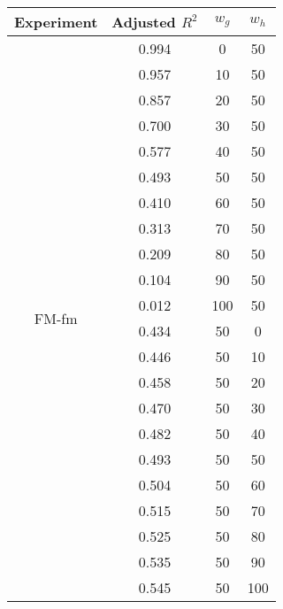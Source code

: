 \documentclass{article}
\begin{document}
\begin{table}[h]
  \centering
  \begin{tabular}{c c c c}
    \toprule
    Experiment                & Adjusted $R^2$ & $w_g$ & $w_h$ \\
    \midrule
    \multirow{22}{*}{FM-fm} & 0.994 & 0 & 50 \\
                              & 0.957 & 10  & 50 \\
                              & 0.857 & 20  & 50 \\
                              & 0.700 & 30  & 50 \\
                              & 0.577 & 40  & 50 \\
                              & 0.493 & 50  & 50 \\
                              & 0.410 & 60  & 50 \\
                              & 0.313 & 70  & 50 \\
                              & 0.209 & 80  & 50 \\
                              & 0.104 & 90  & 50 \\
                              & 0.012 & 100 & 50 \\
                              & 0.434 & 50  & 0 \\
                              & 0.446 & 50  & 10 \\
                              & 0.458 & 50  & 20 \\
                              & 0.470 & 50  & 30 \\
                              & 0.482 & 50  & 40 \\
                              & 0.493 & 50  & 50 \\
                              & 0.504 & 50  & 60 \\
                              & 0.515 & 50  & 70 \\
                              & 0.525 & 50  & 80 \\
                              & 0.535 & 50  & 90 \\
                              & 0.545 & 50  & 100 \\
    \bottomrule
  \end{tabular}
\end{table}
\end{document}
